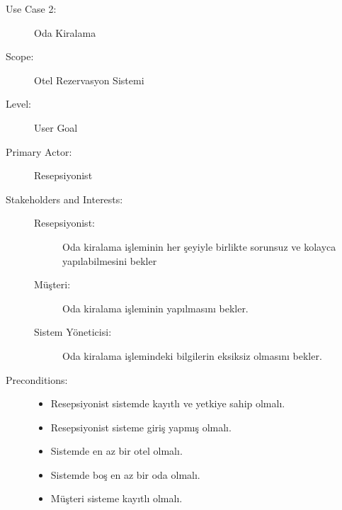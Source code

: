 \documentclass[12pt,a4paper]{report}
\begin{document}
\newpage
\begin{description}
\item[Use Case 2:] Oda Kiralama \\
\item[Scope:] Otel Rezervasyon Sistemi
\item[Level:] User Goal
\item[Primary Actor:] Resepsiyonist 
\item[Stakeholders and Interests:] \hspace{10 mm}
\begin{description} 
\item[Resepsiyonist:] Oda kiralama işleminin her şeyiyle birlikte sorunsuz ve kolayca yapılabilmesini bekler
\item[Müşteri:] Oda kiralama işleminin yapılmasını bekler.
\item[Sistem Yöneticisi:] Oda kiralama işlemindeki bilgilerin eksiksiz olmasını bekler.
\end{description}
\item[Preconditions:] \hspace{10mm}
\begin{itemize}
\item Resepsiyonist sistemde kayıtlı ve yetkiye sahip olmalı.
\item Resepsiyonist sisteme giriş yapmış olmalı.
\item Sistemde en az bir otel olmalı.
\item Sistemde boş en az bir oda olmalı.
\item Müşteri sisteme kayıtlı olmalı.
\end{itemize}


\end{description}
\end{document}
